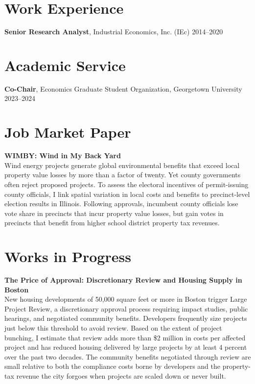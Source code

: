 \documentclass[11pt]{article}
\begin{document}
\section*{Work Experience}

\textbf{Senior Research Analyst}, Industrial Economics, Inc. (IEc) \hfill 2014–2020

\section*{Academic Service}

\textbf{Co-Chair}, Economics Graduate Student Organization, Georgetown University \hfill 2023–2024

\section*{Job Market Paper}

\textbf{WIMBY: Wind in My Back Yard} \\
Wind energy projects generate global environmental benefits that exceed local property value losses by more than a factor of twenty. Yet county governments often reject proposed projects. To assess the electoral incentives of permit-issuing county officials, I link spatial variation in local costs and benefits to precinct-level election results in Illinois. Following approvals, incumbent county officials lose vote share in precincts that incur property value losses, but gain votes in precincts that benefit from higher school district property tax revenues.
\section*{Works in Progress}
\textbf{The Price of Approval: Discretionary Review and Housing Supply in Boston} \\
New housing developments of 50,000 square feet or more in Boston trigger Large Project Review, a discretionary approval process requiring impact studies, public hearings, and negotiated community benefits. Developers frequently size projects just below this threshold to avoid review. Based on the extent of project bunching, I estimate that review adds more than \$2 million in costs per affected project and has reduced housing delivered by large projects by at least 4 percent over the past two decades. The community benefits negotiated through review are small relative to both the compliance costs borne by developers and the property-tax revenue the city forgoes when projects are scaled down or never built. 
\end{document}
